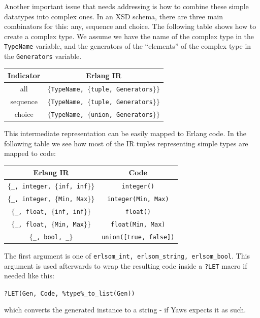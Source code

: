 \documentclass[submission,copyright,a4]{eptcs}
\newcommand{\LET}{\texttt{?LET}\xspace}
\begin{document}
Another important issue that needs addressing is how to combine these simple
datatypes into complex ones. In an XSD schema, there are three main combinators for
this: any, sequence and choice. The following table shows how to create a
complex type. We assume we have the name of the complex type in the 
\texttt{TypeName} variable, and the generators of the ``elements'' of the complex
type in the \texttt{Generators} variable. 

\begin{center}\footnotesize
  \begin{tabular}{cc}
    \toprule
    Indicator & Erlang IR\\
    \midrule
    all & \texttt{$\{$TypeName, $\{$tuple, Generators$\}\}$}\\
    sequence & \texttt{$\{$TypeName, $\{$tuple, Generators$\}\}$}\\
    choice & \texttt{$\{$TypeName, $\{$union, Generators$\}\}$}\\
    \bottomrule
  \end{tabular}
\end{center}

This intermediate representation can be easily mapped to Erlang code. In the 
following table we see how most of the IR tuples representing simple types are
mapped to code:
\begin{center}\footnotesize
  \begin{tabular}{cc}
    \toprule
    Erlang IR & Code\\
    \midrule
    \texttt{$\{$\_, integer, $\{$inf, inf$\}\}$} & \texttt{integer()}\\
    \texttt{$\{$\_, integer, $\{$Min, Max$\}\}$} & \texttt{integer(Min, Max)}\\
    \texttt{$\{$\_, float, $\{$inf, inf$\}\}$} & \texttt{float()}\\
    \texttt{$\{$\_, float, $\{$Min, Max$\}\}$} & \texttt{float(Min, Max)}\\
    \texttt{$\{$\_, bool, \_$\}$} & \texttt{union([true, false])}\\
    \bottomrule
  \end{tabular}
\end{center}

The first argument is one of \texttt{erlsom\_int, erlsom\_string, erlsom\_bool}.
This argument is used afterwards to wrap the resulting code inside a \LET
macro if needed like this:

\begin{center}
  \texttt{?LET(Gen, Code, \%type\%\_to\_list(Gen))}
\end{center}
which converts the generated instance to a string - if Yaws expects it as such.
\end{document}
